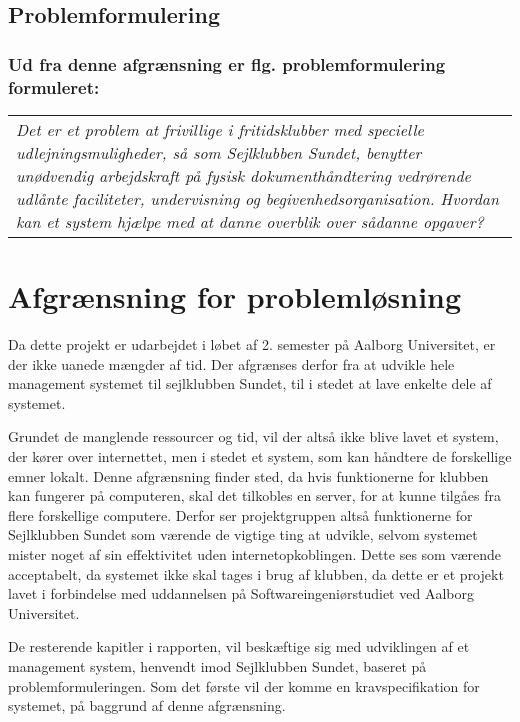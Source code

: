 \subsection*{Problemformulering}
\subsubsection*{Ud fra denne afgrænsning er flg. problemformulering formuleret:}

\begin{center}
  \begin{tabular}{|p{14cm}|}
    \textit{Det er et problem at frivillige i fritidsklubber med specielle udlejningsmuligheder, så som Sejlklubben Sundet, benytter unødvendig arbejdskraft på fysisk dokumenthåndtering vedrørende udlånte faciliteter, undervisning og begivenhedsorganisation. 
    Hvordan kan et system hjælpe med at danne overblik over sådanne opgaver?}
  \end{tabular}
\end{center}


\section{Afgrænsning for problemløsning}

Da dette projekt er udarbejdet i løbet af 2. semester på Aalborg Universitet, er der ikke uanede mængder af tid. 
Der afgrænses derfor fra at udvikle hele management systemet til sejlklubben Sundet, til i stedet at lave enkelte dele af systemet.

Grundet de manglende ressourcer og tid, vil der altså ikke blive lavet et system, der kører over internettet, men i stedet et system, som kan håndtere de forskellige emner lokalt. 
Denne afgrænsning finder sted, da hvis funktionerne for klubben kan fungerer på computeren, skal det tilkobles en server, for at kunne tilgåes fra flere forskellige computere. 
Derfor ser projektgruppen altså funktionerne for Sejlklubben Sundet som værende de vigtige ting at udvikle, selvom systemet mister noget af sin effektivitet uden internetopkoblingen.
Dette ses som værende acceptabelt, da systemet ikke skal tages i brug af klubben, da dette er et projekt lavet i forbindelse med uddannelsen på Softwareingeniørstudiet ved Aalborg Universitet.

De resterende kapitler i rapporten, vil beskæftige sig med udviklingen af et management system, henvendt imod Sejlklubben Sundet, baseret på problemformuleringen. 
Som det første vil der komme en kravspecifikation for systemet, på baggrund af denne afgrænsning.
